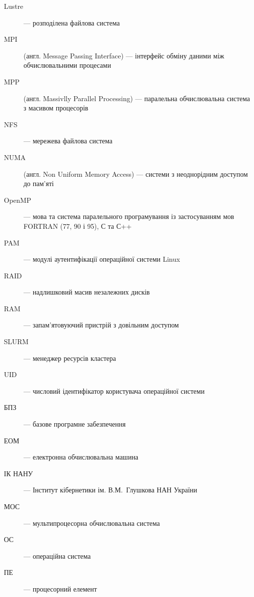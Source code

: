 \begin{description}
\item[Lustre] --- розподілена файлова система
\item[MPI] (англ. Message Passing Interface) --- інтерфейс обміну даними між обчислювальними процесами
\item[MPP] (англ. Massivlly Parallel Processing) --- паралельна обчислювальна система з масивом процесорів
\item[NFS] --- мережева файлова система
\item[NUMA] (англ. Non Uniform Memory Access) --- системи з неоднорідним доступом до пам'яті
\item[OpenMP] --- мова та система паралельного програмування із застосуванням мов FORTRAN (77, 90 і 95), С та С++
\item[PAM] --- модулі аутентифікації операційної системи Linux
\item[RAID] --- надлишковий масив незалежних дисків
\item[RAM] --- запам'ятовуючий пристрій з довільним доступом
\item[SLURM] --- менеджер ресурсів кластера
\item[UID] --- числовий ідентифікатор користувача операційної системи
\item[БПЗ] --- базове програмне забезпечення
\item[ЕОМ] --- електронна обчислювальна машина
\item[ІК НАНУ] --- Інститут кібернетики ім. В.М.~Глушкова НАН України
\item[МОС] --- мультипроцесорна обчислювальна система
\item[ОС] --- операційна система
\item[ПЕ] --- процесорний елемент

\end{description}
